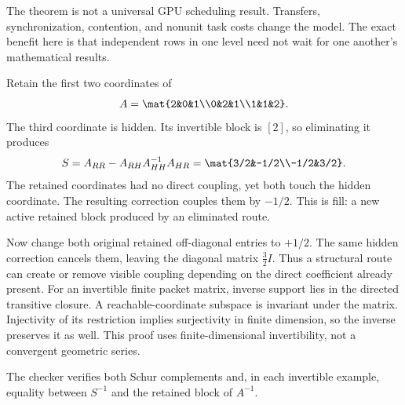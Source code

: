 The theorem is not a universal GPU scheduling result. Transfers, synchronization, contention, and nonunit task costs change the model. The exact benefit here is that independent rows in one level need not wait for one another's mathematical results.

Retain the first two coordinates of
\[
A=\mat{2&0&1\\0&2&1\\1&1&2}.
\]
The third coordinate is hidden. Its invertible block is $[2]$, so eliminating it produces
\[
S=A_{RR}-A_{RH}A_{HH}^{-1}A_{HR}
=\mat{3/2&-1/2\\-1/2&3/2}.
\]
The retained coordinates had no direct coupling, yet both touch the hidden coordinate. The resulting correction couples them by $-1/2$. This is fill: a new active retained block produced by an eliminated route.

Now change both original retained off-diagonal entries to $+1/2$. The same hidden correction cancels them, leaving the diagonal matrix $\frac32 I$. Thus a structural route can create or remove visible coupling depending on the direct coefficient already present.
For an invertible finite packet matrix, inverse support lies in the directed transitive closure. A reachable-coordinate subspace is invariant under the matrix. Injectivity of its restriction implies surjectivity in finite dimension, so the inverse preserves it as well. This proof uses finite-dimensional invertibility, not a convergent geometric series.

The checker verifies both Schur complements and, in each invertible example, equality between $S^{-1}$ and the retained block of $A^{-1}$.


